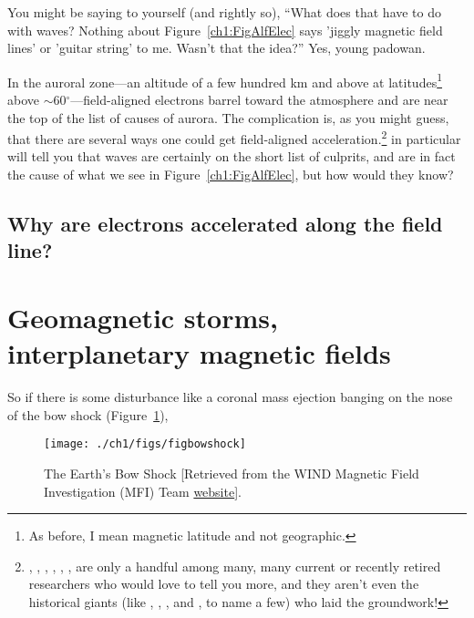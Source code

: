 You might be saying to yourself (and rightly so), ``What does that
have to do with \Alf waves? Nothing about Figure~\ref{ch1:FigAlfElec}
says 'jiggly magnetic field lines' or 'guitar string' to me. Wasn't
that the idea?'' Yes, young padowan. 

In the auroral zone---an altitude of a few hundred km and above at
latitudes\footnote{As before, I mean magnetic latitude and not
  geographic.}  above $\sim$60$^\circ$---field-aligned electrons
barrel toward the atmosphere and are near the top of the list of
causes of aurora. The complication is, as you might guess, that there
are several ways one could get field-aligned
acceleration.\footnote{\citet{Wygant2002}, \citet{Bostrom2003a},
  \citet{Morooka2004}, \citet{Newell2009}, \citet{Hull2010},
  \citet{Mottez2016}, are only a handful among many, many current or
  recently retired researchers who would love to tell you more, and
  they aren't even the historical giants (like \citet{Knight1973},
  \citet{Evans1974}, \citet{Hasegawa1976}, and \citet{Lyons1980a}, to
  name a few) who laid the groundwork!}
\citet{Chaston2002,Chaston2003a,Chaston2007,Chaston2008} in particular
will tell you that \Alf waves are certainly on the short list of
culprits, and are in fact the cause of what we see in
Figure~\ref{ch1:FigAlfElec}, but how would they know?

\subsection{Why are electrons accelerated along the field line?}



\section{Geomagnetic storms, interplanetary magnetic fields}

So if there is some disturbance like a coronal mass ejection banging
on the nose of the bow shock (Figure~\ref{ch1:FigBowShock}),


\begin{figure}
  \centering
  \noindent\texttt{[image: ./ch1/figs/figbowshock]}
  \caption[The Earth's Bow Shock]{The Earth's Bow Shock [Retrieved
    from the WIND Magnetic Field Investigation (MFI) Team
    \href{https://wind.nasa.gov/mfi/team_sciencea.html}{website}].}
  \label{ch1:FigBowShock}
\end{figure}

